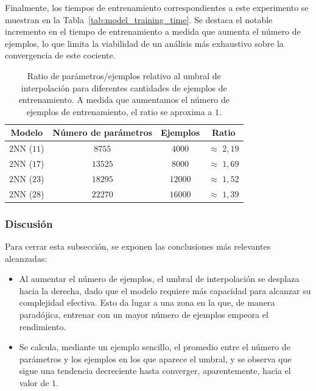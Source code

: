 Finalmente, los tiempos de entrenamiento correspondientes a este experimento se muestran en la Tabla~\ref{tab:model_training_time}. Se destaca el notable incremento en el tiempo de entrenamiento a medida que aumenta el número de ejemplos, lo que limita la viabilidad de un análisis más exhaustivo sobre la convergencia de este cociente.

\begin{table}[h]
    \centering
    \begin{tabular}{|c|c|c|c|}
    \hline
    \textbf{Modelo}       & \textbf{Número de parámetros} & \textbf{Ejemplos} & \textbf{Ratio} \\ 
    \hline
    $2$NN ($11$)          & $8755$   & $4000$  &  $\approx$ $2,19$  \\ 
    $2$NN ($17$)          & $13525$   & $8000$  &  $\approx$ $1,69$  \\ 
    $2$NN ($23$)          & $18295$   & $12000$  &  $\approx$ $1,52$  \\ 
    $2$NN ($28$)          & $22270$   & $16000$  &  $\approx$ $1,39$  \\ 
    \hline
    \end{tabular}
    \caption[Resumen del ratio parámetros/ejemplos.]{Ratio de parámetros/ejemplos relativo al umbral de interpolación para diferentes cantidades de ejemplos de entrenamiento. A medida que aumentamos el número de ejemplos de entrenamiento, el ratio se aproxima a $1$.}\label{tab:ratioparamsexamples}
\end{table}

\subsubsection{Discusión}\label{subsubsec:discusion-numero-ejemplos}

Para cerrar esta subsección, se exponen las conclusiones más relevantes alcanzadas:

\begin{itemize}
    \item Al aumentar el número de ejemplos, el umbral de interpolación se desplaza hacia la derecha, dado que el modelo requiere más capacidad para alcanzar su complejidad efectiva. Esto da lugar a una zona en la que, de manera paradójica, entrenar con un mayor número de ejemplos empeora el rendimiento.
    \item Se calcula, mediante un ejemplo sencillo, el promedio entre el número de parámetros y los ejemplos en los que aparece el umbral, y se observa que sigue una tendencia decreciente hasta converger, aparentemente, hacia el valor de $1$.
\end{itemize}

